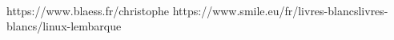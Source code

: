 


\paragraph{}
https://www.blaess.fr/christophe
https://www.smile.eu/fr/livres-blancslivres-blancs/linux-lembarque